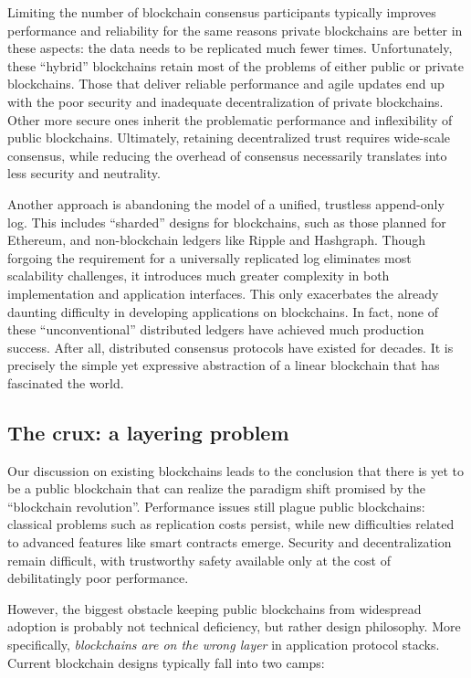 \documentclass[headinclude]{scrbook}
\begin{document}
Limiting the number of blockchain consensus participants typically improves performance and reliability for the same reasons private blockchains are better in these aspects: the data needs to be replicated much fewer times. Unfortunately, these ``hybrid'' blockchains retain most of the problems of either public or private blockchains. Those that deliver reliable performance and agile updates end up with the poor security and inadequate decentralization of private blockchains. Other more secure ones inherit the problematic performance and inflexibility of public blockchains. Ultimately, retaining decentralized trust requires wide-scale consensus, while reducing the overhead of consensus necessarily translates into less security and neutrality.

Another approach is abandoning the model of a unified, trustless append-only log. This includes ``sharded'' designs for blockchains, such as those planned for Ethereum, and non-blockchain ledgers like Ripple and Hashgraph. Though forgoing the requirement for a universally replicated log eliminates most scalability challenges, it introduces much greater complexity in both implementation and application interfaces. This only exacerbates the already daunting difficulty in developing applications on blockchains. In fact, none of these ``unconventional'' distributed ledgers have achieved much production success. After all, distributed consensus protocols have existed for decades. It is precisely the simple yet expressive abstraction of a linear blockchain that has fascinated the world.


\subsection{The crux: a layering problem}

Our discussion on existing blockchains leads to the conclusion that there is yet to be a public blockchain that can realize the paradigm shift promised by the ``blockchain revolution''. Performance issues still plague public blockchains: classical problems such as replication costs persist, while new difficulties related to advanced features like smart contracts emerge. Security and decentralization remain difficult, with trustworthy safety available only at the cost of debilitatingly poor performance.

However, the biggest obstacle keeping public blockchains from widespread adoption is probably not technical deficiency, but rather design philosophy. More specifically, \textit{blockchains are on the wrong layer} in application protocol stacks. Current blockchain designs typically fall into two camps:
\end{document}
